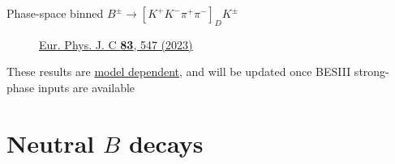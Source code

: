\documentclass[xcolor={dvipsnames}]{beamer}
\begin{document}
\begin{frame}{Phase-space binned $B^\pm\to[K^+K^-\pi^+\pi^-]_DK^\pm$}
\begin{figure}[htb]
\begin{subfigure}{0.5\textwidth}
    \end{subfigure}
    \vspace{-0.5cm}
    \caption*{\tiny\href{https://link.springer.com/article/10.1140/epjc/s10052-023-11560-5}{Eur. Phys. J. C \textbf{83}, 547 (2023)}}
  \end{figure}
  \vspace{-0.5cm}
  \begin{center}
    {\large These results are \underline{model dependent}, and will be updated once BESIII strong-phase inputs are available}
  \end{center}
\end{frame}

\section{Neutral \texorpdfstring{$B$}{B} decays}
\end{document}
